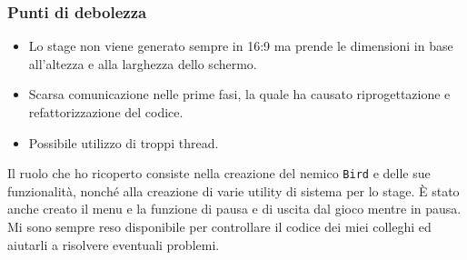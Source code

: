 \documentclass[a4paper,12pt]{report}
\begin{document}
\subsubsection{Punti di debolezza}
\begin{itemize}
    \item Lo stage non viene generato sempre in 16:9 ma prende le dimensioni in base all’altezza e alla larghezza dello schermo.
    \item Scarsa comunicazione nelle prime fasi, la quale ha causato riprogettazione e refattorizzazione del codice.
    \item Possibile utilizzo di troppi thread.
\end{itemize}

Il ruolo che ho ricoperto consiste nella creazione del nemico \texttt{Bird} e delle sue funzionalità, nonché alla creazione di varie utility di sistema per lo stage. È stato anche creato il menu e la funzione di pausa e di uscita dal gioco mentre in pausa. Mi sono sempre reso disponibile per controllare il codice dei miei colleghi ed aiutarli a risolvere eventuali problemi.
\end{document}
